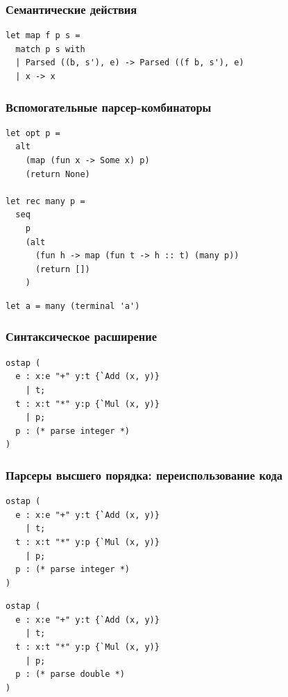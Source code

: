 \documentclass{beamer}
\begin{document}
\begin{frame}[fragile]
  \transwipe[direction=90]
  \frametitle{Семантические действия}  
\begin{lstlisting}[frame=single]  
let map f p s = 
  match p s with
  | Parsed ((b, s'), e) -> Parsed ((f b, s'), e)
  | x -> x
\end{lstlisting}
\end{frame}

\begin{frame}[fragile]
  \transwipe[direction=90]
  \frametitle{Вспомогательные парсер-комбинаторы}  
\begin{lstlisting}[frame=single]  
let opt p = 
  alt 
    (map (fun x -> Some x) p)
    (return None)
    
let rec many p =
  seq 
    p 
    (alt     
      (fun h -> map (fun t -> h :: t) (many p))
      (return [])
    )
\end{lstlisting}

\begin{lstlisting}[frame=single]  
let a = many (terminal 'a')
\end{lstlisting}
\end{frame}

\begin{frame}[fragile]
  \transwipe[direction=90]
  \frametitle{Синтаксическое расширение}  
\begin{lstlisting}[frame=single]  
ostap (
  e : x:e "+" y:t {`Add (x, y)} 
    | t; 
  t : x:t "*" y:p {`Mul (x, y)} 
    | p;
  p : (* parse integer *)
)
\end{lstlisting}
\end{frame}

\begin{frame}[fragile]
  \transwipe[direction=90]
  \frametitle{Парсеры высшего порядка: переиспользование кода}  
\begin{lstlisting}[frame=single]  
ostap (
  e : x:e "+" y:t {`Add (x, y)} 
    | t; 
  t : x:t "*" y:p {`Mul (x, y)} 
    | p;
  p : (* parse integer *)
)
\end{lstlisting}
  
\begin{lstlisting}[frame=single]  
ostap (
  e : x:e "+" y:t {`Add (x, y)} 
    | t; 
  t : x:t "*" y:p {`Mul (x, y)} 
    | p;
  p : (* parse double *)
)
\end{lstlisting}	  
  
\end{frame}
\end{document}
